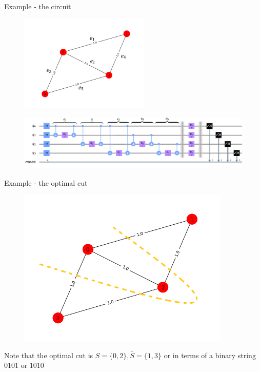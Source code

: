 \documentclass{beamer}
\begin{document}
{\begin{frame}{Example - the circuit}
\begin{figure}
	\centering
	\includegraphics[width=0.55\textwidth]{figures/diamond-graph-edges}
\end{figure}
\begin{figure}
	\centering
	\includegraphics[width=\textwidth]{figures/circuit_diamond_edit2}
\end{figure}
\end{frame}

\begin{frame}{Example - the optimal cut}
\begin{figure}
	\centering
	\includegraphics[width=0.9\textwidth]{figures/diamond-graph-cut}
\end{figure}
Note that the optimal cut is $S = \{0,2\}, \bar{S}=\{1,3\}$ or in terms of a binary string $0101$ or $1010$
\end{frame}

}
\end{document}
